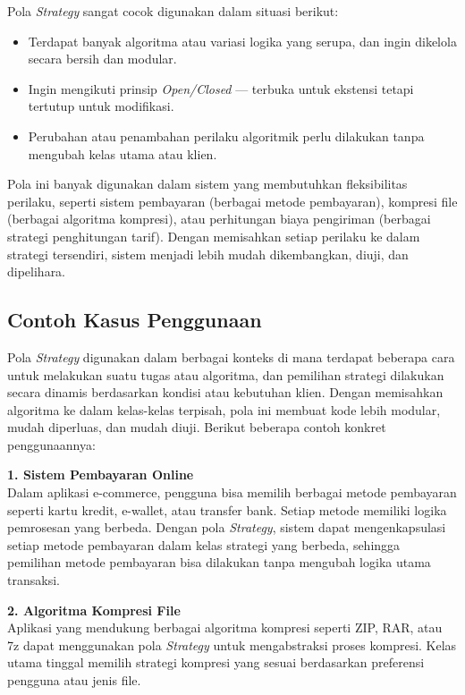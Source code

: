 Pola \textit{Strategy} sangat cocok digunakan dalam situasi berikut:
\begin{itemize}
	\item Terdapat banyak algoritma atau variasi logika yang serupa, dan ingin dikelola secara bersih dan modular.
	\item Ingin mengikuti prinsip \textit{Open/Closed} — terbuka untuk ekstensi tetapi tertutup untuk modifikasi.
	\item Perubahan atau penambahan perilaku algoritmik perlu dilakukan tanpa mengubah kelas utama atau klien.
\end{itemize}

Pola ini banyak digunakan dalam sistem yang membutuhkan fleksibilitas perilaku, seperti sistem pembayaran (berbagai metode pembayaran), kompresi file (berbagai algoritma kompresi), atau perhitungan biaya pengiriman (berbagai strategi penghitungan tarif). Dengan memisahkan setiap perilaku ke dalam strategi tersendiri, sistem menjadi lebih mudah dikembangkan, diuji, dan dipelihara.

\subsection{Contoh Kasus Penggunaan}

Pola \textit{Strategy} digunakan dalam berbagai konteks di mana terdapat beberapa cara untuk melakukan suatu tugas atau algoritma, dan pemilihan strategi dilakukan secara dinamis berdasarkan kondisi atau kebutuhan klien. Dengan memisahkan algoritma ke dalam kelas-kelas terpisah, pola ini membuat kode lebih modular, mudah diperluas, dan mudah diuji. Berikut beberapa contoh konkret penggunaannya:

\textbf{1. Sistem Pembayaran Online} \\
Dalam aplikasi e-commerce, pengguna bisa memilih berbagai metode pembayaran seperti kartu kredit, e-wallet, atau transfer bank. Setiap metode memiliki logika pemrosesan yang berbeda. Dengan pola \textit{Strategy}, sistem dapat mengenkapsulasi setiap metode pembayaran dalam kelas strategi yang berbeda, sehingga pemilihan metode pembayaran bisa dilakukan tanpa mengubah logika utama transaksi.

\textbf{2. Algoritma Kompresi File} \\
Aplikasi yang mendukung berbagai algoritma kompresi seperti ZIP, RAR, atau 7z dapat menggunakan pola \textit{Strategy} untuk mengabstraksi proses kompresi. Kelas utama tinggal memilih strategi kompresi yang sesuai berdasarkan preferensi pengguna atau jenis file.

